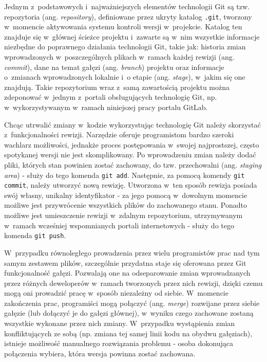 Jednym z~podstawowych i~najważniejszych elementów technologii Git są tzw. repozytoria (ang. \emph{repository}), definiowane przez ukryty katalog \lstinline{.git}, tworzony w~momencie aktywowania systemu kontroli wersji w~projekcie. Katalog ten znajduje się w~głównej ścieżce projektu i~zawarte są w~nim wszystkie informacje niezbędne do poprawnego działania technologii Git, takie jak: historia zmian wprowadzonych w~poszczególnych plikach w~ramach każdej rewizji (ang. \emph{commit}), dane na temat gałęzi (ang. \emph{branch}) projektu oraz informacje o~zmianach wprowadzonych lokalnie i~o etapie (ang. \emph{stage}), w~jakim się one znajdują. Takie repozytorium wraz z~samą zawartością projektu można zdeponować w~jednym z~portali obsługujących technologię Git, np. w~wykorzystywanym w~ramach niniejszej pracy portalu GitLab. 

Chcąc utrwalić zmiany w~kodzie wykorzystując technologię Git należy skorzystać z~funkcjonalności rewizji. Narzędzie oferuje programistom bardzo szeroki wachlarz możliwości, jednakże proces postępowania w~swojej najprostszej, często spotykanej wersji nie jest skomplikowany. Po wprowadzeniu zmian należy dodać pliki, których stan powinien zostać zachowany, do tzw. przechowalni (ang. \emph{staging area}) - służy do tego komenda \lstinline{git add}. Następnie, za pomocą komendy \lstinline{git commit}, należy utworzyć nową rewizję. Utworzona w~ten sposób rewizja posiada swój własny, unikalny identyfikator - za jego pomocą w~dowolnym momencie możliwe jest przywrócenie wszystkich plików do zachowanego stanu. Ponadto możliwe jest umieszczenie rewizji w~zdalnym repozytorium, utrzymywanym w~ramach wcześniej wspomnianych portali internetowych - służy do tego komenda \lstinline{git push}.

W~przypadku równoległego prowadzenia przez wielu programistów prac nad tym samym zestawem plików, szczególnie przydatna staje się oferowana przez Git funkcjonalność gałęzi. Pozwalają one na odseparowanie zmian wprowadzanych przez różnych deweloperów w~ramach tworzonych przez nich rewizji, dzięki czemu mogą oni prowadzić pracę w~sposób niezależny od siebie. W~momencie zakończenia prac, programiści mogą połączyć (ang. \emph{merge}) rozwijane przez siebie gałęzie (lub dołączyć je do gałęzi głównej), w~wyniku czego zachowane zostaną wszystkie wykonane przez nich zmiany. W~przypadku wystąpienia zmian konfliktujących ze sobą (np. zmiana tej samej linii kodu na obydwu gałęziach), istnieje możliwość manualnego rozwiązania problemu - osoba dokonująca połączenia wybiera, która wersja powinna zostać zachowana.

